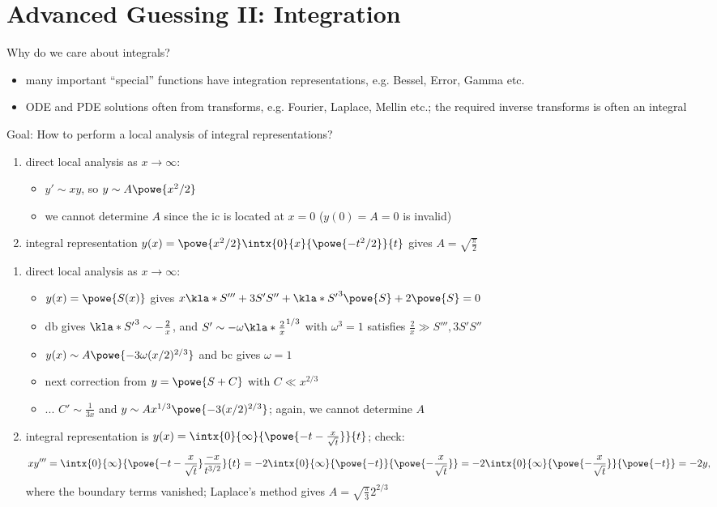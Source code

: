 \documentclass[english, parskip=full]{scrbook}
\newcommand{\example}[3]{\begin{tcolorbox}[colback=colorbackgroundexample,colframe=colorexample, breakable,enhanced,title={\textbf{#1}: #2.}]#3\end{tcolorbox}}
\begin{document}
\chapter{Advanced Guessing II: Integration}
Why do we care about integrals?
\begin{itemize}
\item many important ``special'' functions have integration representations, e.g. Bessel, Error, Gamma etc.
\item ODE and PDE solutions often from transforms, e.g. Fourier, Laplace, Mellin etc.; the required inverse transforms is often an integral
\end{itemize}
Goal: How to perform a local analysis of integral representations?
\example{Example}{$y'=xy+1$ with $y(0)=0$}{\begin{enumerate}
\item direct local analysis as $x\rightarrow\infty$:
\begin{itemize}
\item $y'\sim xy$, so $y\sim A\powe{x^2/2}$
\item we cannot determine $A$ since the \gls{ic} is located at $x=0$ ($y(0)=A=0$ is invalid)
\end{itemize}
\item integral representation $y(x) = \powe{x^2/2} \intx{0}{x}{\powe{-t^2/2}}{t}$ gives $A=\sqrt{\frac{\pi}{2}}$
\end{enumerate}}
\example{Another example}{$xy''' + 2y = 0$ with $y(0)=1$ and $y(\infty)=0$}{\begin{enumerate}
\item direct local analysis as $x\rightarrow\infty$:
\begin{itemize}
\item $y(x) = \powe{S(x)}$ gives $x\kla*{S''' + 3S'S'' + \kla*{S'}^3}\powe{S} + 2\powe{S} = 0$
\item \gls{db} gives $\kla*{S'}^3 \sim -\frac{2}{x}$, and $S'\sim -\omega \kla*{\frac{2}{x}}^{1/3}$ with $\omega^3=1$ satisfies $\frac{2}{x} \gg S''',3S'S''$
\item $y(x) \sim A \powe{-3\omega (x/2)^{2/3}}$ and \gls{bc} gives $\omega=1$
\item next correction from $y=\powe{S+C}$ with $C\ll x^{2/3}$
\item ... $C'\sim \frac{1}{3x}$ and $y\sim Ax^{1/3} \powe{-3(x/2)^{2/3}}$; again, we cannot determine $A$
\end{itemize}
\item integral representation is $y(x) = \intx{0}{\infty}{\powe{-t - \frac{x}{\sqrt{t}}}}{t}$; check:
\begin{align}
xy''' &= \intx{0}{\infty}{\powe{-t-\frac{x}{\sqrt{t}}} \frac{-x}{t^{3/2}} }{t} = -2\intx{0}{\infty}{\powe{-t} }{\powe{-\frac{x}{\sqrt{t}}}} = -2\intx{0}{\infty}{\powe{-\frac{x}{\sqrt{t}}}}{\powe{-t}} = -2y,
\end{align} %
where the boundary terms vanished; Laplace's method gives $A=\sqrt{\frac{\pi}{3}} 2^{2/3}$
\end{enumerate}
}
\end{document}
